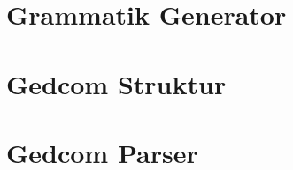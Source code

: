 \section{Grammatik Generator}
\label{sec: Implementierung - Grammatik Generator}


\section{Gedcom Struktur}
\label{sec: Implementierung - Gedcom Struktur}


\section{Gedcom Parser}
\label{sec: Implementierung - Gedcom Parser}


